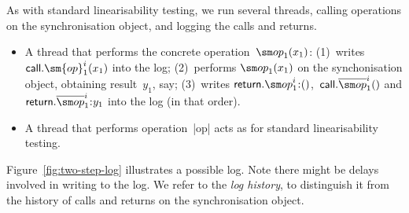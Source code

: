 As with standard linearisability testing, we run several threads, calling
operations on the synchronisation object, and logging the calls and returns. 
%
\begin{itemize}
\item A thread that performs the concrete operation~$\op_1(x_1)$: (1)~writes
  $\call.\sm{op}_1^i(x_1)$ into the log; (2)~performs $\op_1(x_1)$ on the
  synchonisation object, obtaining result~$y_1$, say; (3)~writes
  $\return.\op_1^i \:: ()$,\, $\call.\overline{\op}_1^i()$ and
  $\return.\overline{\op}_1^i \:: y_1$ into the log (in that order).

\item A thread that performs operation~|op| acts as for standard
  linearisability testing.
\end{itemize}
%
Figure~\ref{fig:two-step-log} illustrates a possible log.
%
Note there might be delays involved in writing to the log.  We refer to the
\emph{log history}, to distinguish it from the history of calls and returns on
the synchronisation object.  


